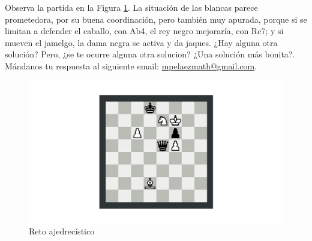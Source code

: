 Observa la partida en la Figura \ref{partida}. La situación de las blancas parece prometedora, por su buena coordinación, pero también muy apurada, porque si se limitan a defender el caballo, con Ab4, el rey negro mejoraría, con Rc7; y si mueven el jamelgo, la dama negra se activa y da jaques. ¿Hay alguna otra solución? Pero, ¿se te ocurre alguna otra solucion? ¿Una solución más bonita?. Mándanos tu respuesta al siguiente email: \url{mpelaezmath@gmail.com}.
\begin{figure}[!ht]
\centering \includegraphics[scale=0.2]{partida2.png}
\caption{Reto ajedrecístico}\label{partida}
\end{figure}




